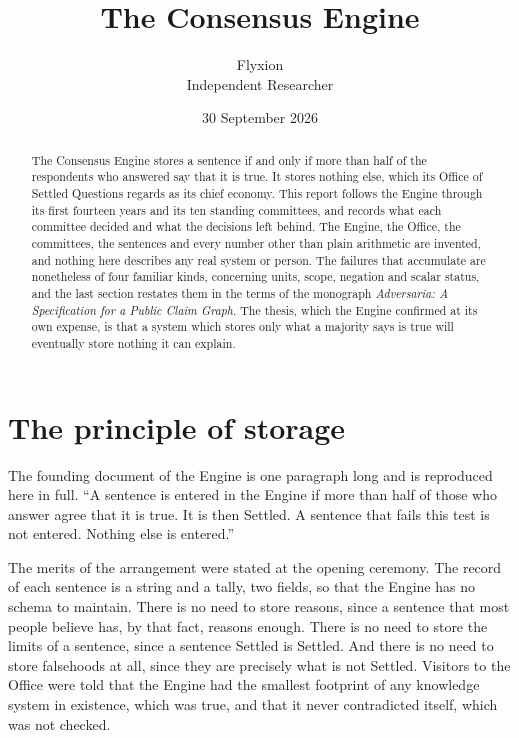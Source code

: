\documentclass[11pt]{article}
\title{The Consensus Engine}
\author{Flyxion\\\small Independent Researcher}
\date{30 September 2026}
\begin{document}
\maketitle

\begin{abstract}
\noindent
The Consensus Engine stores a sentence if and only if more than half of the respondents who answered say that it is true. It stores nothing else, which its Office of Settled Questions regards as its chief economy. This report follows the Engine through its first fourteen years and its ten standing committees, and records what each committee decided and what the decisions left behind. The Engine, the Office, the committees, the sentences and every number other than plain arithmetic are invented, and nothing here describes any real system or person. The failures that accumulate are nonetheless of four familiar kinds, concerning units, scope, negation and scalar status, and the last section restates them in the terms of the monograph \emph{Adversaria: A Specification for a Public Claim Graph}. The thesis, which the Engine confirmed at its own expense, is that a system which stores only what a majority says is true will eventually store nothing it can explain.
\end{abstract}

\section{The principle of storage}

The founding document of the Engine is one paragraph long and is reproduced here in full. ``A sentence is entered in the Engine if more than half of those who answer agree that it is true. It is then Settled. A sentence that fails this test is not entered. Nothing else is entered.''

The merits of the arrangement were stated at the opening ceremony. The record of each sentence is a string and a tally, two fields, so that the Engine has no schema to maintain. There is no need to store reasons, since a sentence that most people believe has, by that fact, reasons enough. There is no need to store the limits of a sentence, since a sentence Settled is Settled. And there is no need to store falsehoods at all, since they are precisely what is not Settled. Visitors to the Office were told that the Engine had the smallest footprint of any knowledge system in existence, which was true, and that it never contradicted itself, which was not checked.
\end{document}
